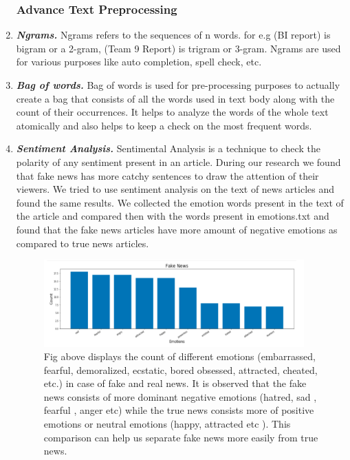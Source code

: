 \documentclass[runningheads]{llncs}
\begin{document}
\begin{enumerate}
\subsubsection{Advance Text Preprocessing}

\item \textbf{\emph{Ngrams.}}
Ngrams refers to the sequences of n words. for e.g (BI report) is bigram or a 2-gram, (Team 9 Report) is trigram or 3-gram. Ngrams are used for various purposes like auto completion, spell check, etc.
\newline
\newline
\item \textbf{\emph{Bag of words.}}
Bag of words is used for pre-processing purposes to actually create a bag that consists of all the words used in text body along with the count of their occurrences. It helps to analyze the words of the whole text atomically and also helps to keep a check on the most frequent words.
\newline
\newline
\item \textbf{\emph{Sentiment Analysis.}}
Sentimental Analysis is a technique to check the polarity of any sentiment present in an article. During our research we found that fake news has more catchy sentences to draw the attention of their viewers. We tried to use sentiment analysis on the text of news articles and found the same results. We collected the emotion words present in the text of the article and compared then with the words present in emotions.txt and found that the fake news articles have more amount of negative emotions as compared to true news articles.
\begin{figure}
\centering
\includegraphics[width=10cm]{fake.png}
\caption{Fig above displays the count of different emotions (embarrassed, fearful, demoralized, ecstatic, bored obsessed, attracted, cheated, etc.) in case of fake and real news. It is observed that the fake news consists of more dominant negative emotions (hatred, sad , fearful , anger etc) while the true news consists more of positive emotions or neutral emotions (happy, attracted etc ). This comparison can help us separate fake news more easily from true news.} \label{fig3}

\end{figure}
\end{enumerate}
\end{document}
